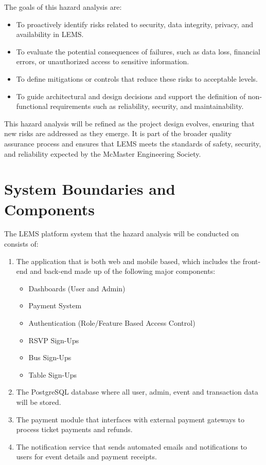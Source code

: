 \documentclass{article}
\begin{document}
\par
\vspace{1em}

The goals of this hazard analysis are:
\begin{itemize}
  \item To proactively identify risks related to security, data integrity, privacy, and availability in LEMS.
  \item To evaluate the potential consequences of failures, such as data loss, financial errors, or 
        unauthorized access to sensitive information.
  \item To define mitigations or controls that reduce these risks to acceptable levels.
  \item To guide architectural and design decisions and support the definition of non-functional 
        requirements such as reliability, security, and maintainability.
\end{itemize}

This hazard analysis will be refined as the project design evolves, ensuring that new risks are 
addressed as they emerge. It is part of the broader quality assurance process and ensures that LEMS 
meets the standards of safety, security, and reliability expected by the McMaster Engineering Society.

\section{System Boundaries and Components}

The LEMS platform system that the hazard analysis will be conducted on consists of:
\begin{enumerate}
    \item The application that is both web and mobile based, which includes the front-end and back-end made up of the following major components:
    \begin{itemize}
        \item Dashboards (User and Admin)
        \item Payment System
        \item Authentication (Role/Feature Based Access Control)
        \item RSVP Sign-Ups
        \item Bus Sign-Ups
        \item Table Sign-Ups
    \end{itemize}
    \item The PostgreSQL database where all user, admin, event and transaction data will be stored.
    \item The payment module that interfaces with external payment gateways to process ticket payments and refunds.
    \item The notification service that sends automated emails and notifications to users for event details and payment receipts.
\end{enumerate}
\end{document}
